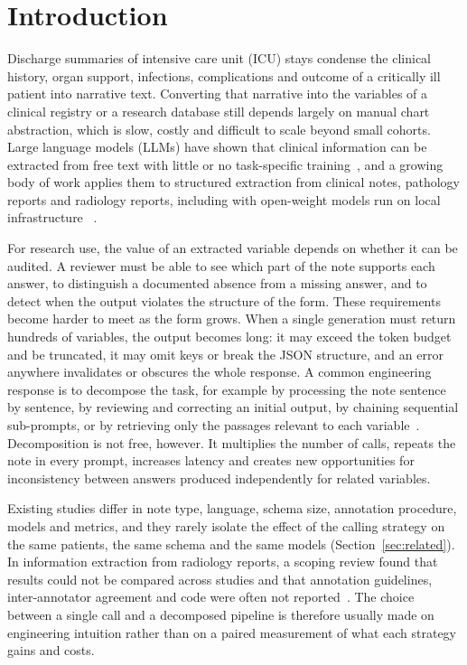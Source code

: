 \section{Introduction}\label{sec:intro}

Discharge summaries of intensive care unit (ICU) stays condense the clinical history,
organ support, infections, complications and outcome of a critically ill patient into
narrative text. Converting that narrative into the variables of a clinical registry or a
research database still depends largely on manual chart abstraction, which is slow, costly
and difficult to scale beyond small cohorts. Large language models (LLMs) have shown that
clinical information can be extracted from free text with little or no task-specific
training~\cite{agrawal2022fewshot}, and a growing body of work applies them to structured
extraction from clinical notes, pathology reports and radiology reports, including with open-weight
models run on local infrastructure%
~\cite{privacy2024structured,iterativerefine2025,clinicalentityretrieval2024,spaanderman2025structured}.

For research use, the value of an extracted variable depends on whether it can be audited.
A reviewer must be able to see which part of the note supports each answer, to distinguish
a documented absence from a missing answer, and to detect when the output violates the
structure of the form. These requirements become harder to meet as the form grows. When a
single generation must return hundreds of variables, the output becomes long: it may exceed
the token budget and be truncated, it may omit keys or break the JSON structure, and an
error anywhere invalidates or obscures the whole response. A common engineering response is
to decompose the task, for example by processing the note sentence by sentence, by reviewing
and correcting an initial output, by chaining sequential sub-prompts, or by retrieving only the
passages relevant to each variable~\cite{llmie2025,fornasiere2024medical,spaanderman2025structured,clinicalentityretrieval2024}. Decomposition is not
free, however. It multiplies the number of calls, repeats the note in every prompt, increases
latency and creates new opportunities for inconsistency between answers produced
independently for related variables.

Existing studies differ in note type, language, schema size, annotation procedure, models and
metrics, and they rarely isolate the effect of the calling strategy on the same patients, the
same schema and the same models (Section~\ref{sec:related}). In information extraction from
radiology reports, a scoping review found that results could not be compared across studies and
that annotation guidelines, inter-annotator agreement and code were often not
reported~\cite{scoping2024radiology}. The choice between a
single call and a decomposed pipeline is therefore usually made on engineering intuition rather
than on a paired measurement of what each strategy gains and costs.

